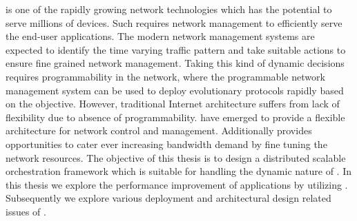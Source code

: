  is one of the rapidly growing network technologies which has the potential to serve millions of devices. Such  requires network management to efficiently serve the end-user applications. The modern network management systems are expected to identify the time varying traffic pattern and take suitable actions to ensure fine grained network management. Taking this kind of dynamic decisions requires programmability in the network, where the programmable network management system can be used to deploy evolutionary protocols rapidly based on the objective. However, traditional Internet architecture suffers from lack of flexibility due to absence of programmability.   have emerged to provide a flexible architecture for network control and management. Additionally  provides opportunities to cater ever increasing bandwidth demand by fine tuning the network resources. The objective of this thesis is to design a distributed scalable  orchestration framework which is suitable for handling the dynamic nature of . In this thesis we explore the performance improvement of  applications by utilizing . Subsequently we explore various deployment and architectural design related issues of .

